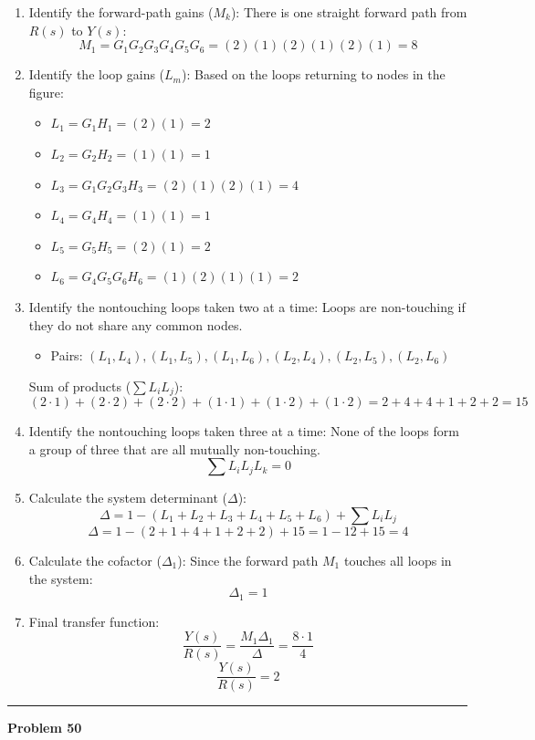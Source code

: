 \documentclass[11pt]{article}
\begin{document}
\begin{enumerate}[label=(\alph*), itemindent=*, leftmargin=*, nolistsep]
    \item Identify the forward-path gains ($M_k$):
    There is one straight forward path from $R(s)$ to $Y(s)$:
    \[
    M_1 = G_1 G_2 G_3 G_4 G_5 G_6 = (2)(1)(2)(1)(2)(1) = 8
    \]

    \item Identify the loop gains ($L_m$):
    Based on the loops returning to nodes in the figure:
    \begin{itemize}
        \item $L_1 = G_1 H_1 = (2)(1) = 2$
        \item $L_2 = G_2 H_2 = (1)(1) = 1$
        \item $L_3 = G_1 G_2 G_3 H_3 = (2)(1)(2)(1) = 4$
        \item $L_4 = G_4 H_4 = (1)(1) = 1$
        \item $L_5 = G_5 H_5 = (2)(1) = 2$
        \item $L_6 = G_4 G_5 G_6 H_6 = (1)(2)(1)(1) = 2$
    \end{itemize}

    \item Identify the nontouching loops taken two at a time:
    Loops are non-touching if they do not share any common nodes.
    \begin{itemize}
        \item Pairs: $(L_1, L_4), (L_1, L_5), (L_1, L_6), (L_2, L_4), (L_2, L_5), (L_2, L_6)$
    \end{itemize}
    Sum of products ($\sum L_i L_j$):
    \[
    (2\cdot1) + (2\cdot2) + (2\cdot2) + (1\cdot1) + (1\cdot2) + (1\cdot2) = 2 + 4 + 4 + 1 + 2 + 2 = 15
    \]

    \item Identify the nontouching loops taken three at a time:
    None of the loops form a group of three that are all mutually non-touching.
    \[
    \sum L_i L_j L_k = 0
    \]

    \item Calculate the system determinant ($\Delta$):
    \[
    \Delta = 1 - (L_1 + L_2 + L_3 + L_4 + L_5 + L_6) + \sum L_i L_j
    \]
    \[
    \Delta = 1 - (2 + 1 + 4 + 1 + 2 + 2) + 15 = 1 - 12 + 15 = \boxed{4}
    \]

    \item Calculate the cofactor ($\Delta_1$):
    Since the forward path $M_1$ touches all loops in the system:
    \[
    \Delta_1 = 1
    \]

    \item Final transfer function:
    \[
    \frac{Y(s)}{R(s)} = \frac{M_1 \Delta_1}{\Delta} = \frac{8 \cdot 1}{4}
    \]
    \[
    \boxed{
    \frac{Y(s)}{R(s)} = 2
    }
    \]

\end{enumerate}
\newpage
  \setcounter{page}{77}  
\noindent\rule{\textwidth}{1pt}
\noindent\textbf{Problem 50} \hfill
\end{document}
